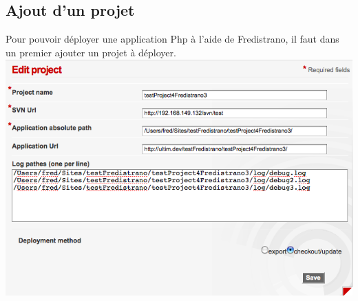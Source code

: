 \documentclass[12pt,a4paper]{report}
\begin{document}
\subsection{Ajout d'un projet}
Pour pouvoir déployer une application Php à l'aide de Fredistrano, il faut dans un premier ajouter un projet à déployer.\\
\includegraphics[width=1\textwidth]{doc_fredistrano1.png} 
\end{document}
